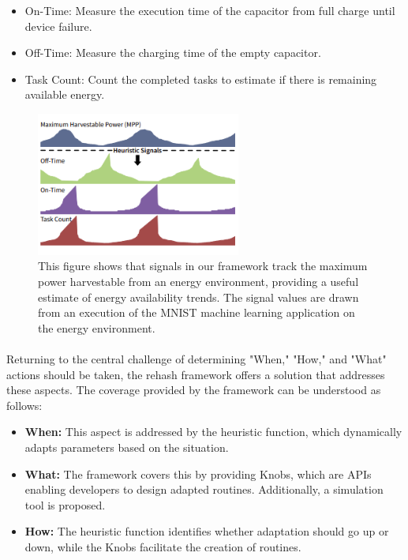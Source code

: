     \begin{itemize}
        \item On-Time: Measure the execution time of the capacitor from full charge until device failure.
        \item Off-Time: Measure the charging time of the empty capacitor.
        \item Task Count: Count the completed tasks to estimate if there is remaining available energy.
    \end{itemize}

    \begin{figure}[htbp]
        \centering
        \includegraphics[width=0.6\textwidth]{img/chap2/Figure - REHASH Signals.png}
        \caption{This figure shows that signals in our framework track the maximum power harvestable from an energy environment, providing a useful estimate of energy availability trends. The signal values are drawn from an execution of the MNIST machine learning application on the energy environment.\cite{10.1145/3478077}}
        \label{fig:REHASHsignal}
    \end{figure}

    \paragraph{}
        Returning to the central challenge of determining "When," "How," and "What" actions should be taken, the \gls{rehash} framework offers a solution that addresses these aspects\cite{basedArticle}. The coverage provided by the framework can be understood as follows:
        
        \begin{itemize}
            \item \textbf{When:} This aspect is addressed by the \gls{heuristic} function, which dynamically adapts parameters based on the situation.
            \item \textbf{What:} The framework covers this by providing Knobs, which are APIs enabling developers to design adapted routines. Additionally, a simulation tool is proposed.
            \item \textbf{How:} The \gls{heuristic} function identifies whether adaptation should go up or down, while the Knobs facilitate the creation of routines.
        \end{itemize}